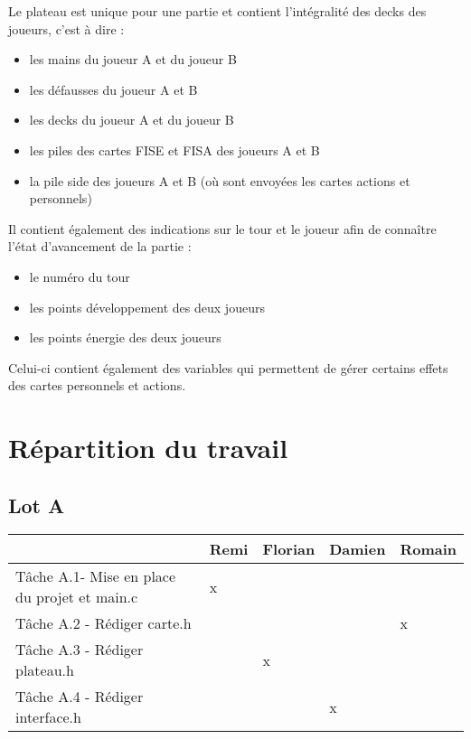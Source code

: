 \documentclass[11pt]{article}
\begin{document}
Le plateau est unique pour une partie et contient l'intégralité des decks des joueurs, c'est à dire :
\begin{itemize}
	\item les mains du joueur A et du joueur B
	\item les défausses du joueur A et B
	\item les decks du joueur A et du joueur B
	\item les piles des cartes FISE et FISA des joueurs A et B
	\item la pile side des joueurs A et B (où sont envoyées les cartes actions et personnels)
\end{itemize} 
Il contient également des indications sur le tour et le joueur afin de connaître l'état d'avancement de la partie :
\begin{itemize}
\item le numéro du tour
\item les points développement des deux joueurs
\item les points énergie des deux joueurs 	
\end{itemize}

Celui-ci contient également des variables qui permettent de gérer certains effets des cartes personnels et actions.

\section{Répartition du travail}

\subsection{Lot A}
\begin{tabular}{|p{8cm}|p{1.3cm}|p{1.3cm}|p{1.4cm}|p{1.6cm}|}
\hline
& Remi  & Florian  &  Damien &  Romain \\
\hline
Tâche A.1- Mise en place du projet et main.c & x& & & \\
\hline
Tâche A.2 - Rédiger carte.h&  &  & &x  \\
\hline
Tâche A.3 - Rédiger plateau.h & &x &  &  \\
\hline
Tâche A.4 - Rédiger interface.h
 &&&  x&\\
\hline
\end{tabular}
\end{document}
